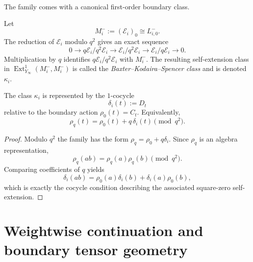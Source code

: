 The family comes with a canonical first-order boundary class.

\begin{definition}
\label{def:baxter-kodaira-spencer-class}
Let
\begin{equation}
M_i^-:=(\mathcal E_i)_0\cong L^-_{i,0}.
\end{equation}
The reduction of $\mathcal E_i$ modulo $q^2$ gives an exact sequence
\begin{equation}
0\longrightarrow q\mathcal E_i/q^2\mathcal E_i
\longrightarrow \mathcal E_i/q^2\mathcal E_i
\longrightarrow \mathcal E_i/q\mathcal E_i
\longrightarrow 0.
\end{equation}
Multiplication by $q$ identifies $q\mathcal E_i/q^2\mathcal E_i$ with
$M_i^-$.  The resulting self-extension class in
$\operatorname{Ext}^1_{Y_\infty}(M_i^-,M_i^-)$ is called the
\emph{Baxter--Kodaira--Spencer class} and is denoted $\kappa_i$.
\end{definition}

\begin{theorem}
\ClaimStatusProvedHere
\label{thm:concrete-cocycle-representative}
The class $\kappa_i$ is represented by the $1$-cocycle
\begin{equation}
\delta_i(t):=D_t
\end{equation}
relative to the boundary action $\rho_0(t)=C_t$.  Equivalently,
\begin{equation}
\rho_q(t)=\rho_0(t)+q\,\delta_i(t)\pmod{q^2}.
\end{equation}
\end{theorem}

\begin{proof}
Modulo $q^2$ the family has the form
$\rho_q=\rho_0+q\delta_i$.  Since $\rho_q$ is an algebra representation,
\begin{equation}
\rho_q(ab)=\rho_q(a)\rho_q(b)\pmod{q^2}.
\end{equation}
Comparing coefficients of $q$ yields
\begin{equation}
\delta_i(ab)=\rho_0(a)\delta_i(b)+\delta_i(a)\rho_0(b),
\end{equation}
which is exactly the cocycle condition describing the associated
square-zero self-extension.
\end{proof}

\section{Weightwise continuation and boundary tensor geometry}
\label{sec:typeA-boundary-tensor-geometry}

